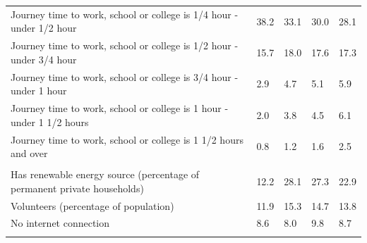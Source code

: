 \documentclass{article}
\begin{document}
\begin{table}[h]
\begin{tabular}{KTTTT}
Journey time to work, school or college is 1/4 hour - under 1/2 hour & 38.2& 33.1& 30.0& 28.1\\
Journey time to work, school or college is 1/2 hour - under 3/4 hour & 15.7& 18.0& 17.6& 17.3\\
Journey time to work, school or college is 3/4 hour - under 1 hour & 2.9& 4.7& 5.1& 5.9\\
Journey time to work, school or college is 1 hour - under 1 1/2 hours & 2.0& 3.8& 4.5& 6.1\\
Journey time to work, school or college is 1 1/2 hours and over & 0.8& 1.2& 1.6& 2.5\\
\hline
    \\ 
    \hline
Has renewable energy source (percentage of permanent private households) & 12.2& 28.1& 27.3& 22.9\\
    \hline
Volunteers (percentage of population) & 11.9& 15.3& 14.7& 13.8\\
    \hline
No internet connection& 8.6& 8.0& 9.8& 8.7\\
\hline
\end{tabular}
\end{table}
\end{document}
